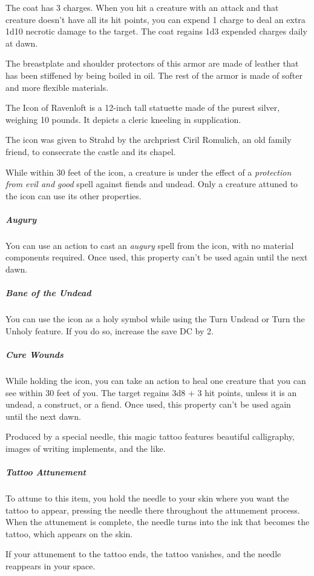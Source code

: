 \documentclass[10pt,a4paper,twoside,bg=print,twocolumn,openany,nodeprecatedcode]{dndbook}
\begin{document}
The coat has 3 charges. When you hit a creature with an attack and that creature doesn't have all its hit points, you can expend 1 charge to deal an extra 1d10 necrotic damage to the target. The coat regains 1d3 expended charges daily at dawn.

The breastplate and shoulder protectors of this armor are made of leather that has been stiffened by being boiled in oil. The rest of the armor is made of softer and more flexible materials.

The Icon of Ravenloft is a 12-inch tall statuette made of the purest silver, weighing 10 pounds. It depicts a cleric kneeling in supplication.

The icon was given to Strahd by the archpriest Ciril Romulich, an old family friend, to consecrate the castle and its chapel.

While within 30 feet of the icon, a creature is under the effect of a \textit{protection from evil and good} spell against fiends and undead. Only a creature attuned to the icon can use its other properties.

\subparagraph{Augury}
You can use an action to cast an \textit{augury} spell from the icon, with no material components required. Once used, this property can't be used again until the next dawn.

\subparagraph{Bane of the Undead}
You can use the icon as a holy symbol while using the Turn Undead or Turn the Unholy feature. If you do so, increase the save DC by 2.

\subparagraph{Cure Wounds}
While holding the icon, you can take an action to heal one creature that you can see within 30 feet of you. The target regains 3d8 + 3 hit points, unless it is an undead, a construct, or a fiend. Once used, this property can't be used again until the next dawn.

Produced by a special needle, this magic tattoo features beautiful calligraphy, images of writing implements, and the like.

\subparagraph{Tattoo Attunement}
To attune to this item, you hold the needle to your skin where you want the tattoo to appear, pressing the needle there throughout the attunement process. When the attunement is complete, the needle turns into the ink that becomes the tattoo, which appears on the skin.

If your attunement to the tattoo ends, the tattoo vanishes, and the needle reappears in your space.
\end{document}
